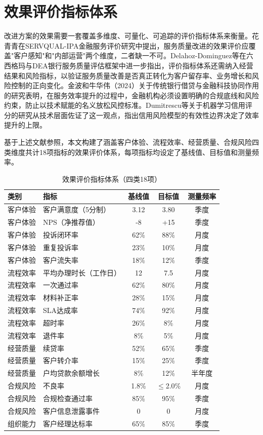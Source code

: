 \section{效果评价指标体系}

改进方案的效果需要一套覆盖多维度、可量化、可追踪的评价指标体系来衡量。花青青在SERVQUAL-IPA金融服务评价研究中提出，服务质量改进的效果评价应覆盖"客户感知"和"内部运营"两个维度，二者缺一不可\cite{ref15}。Delahoz-Dominguez等在六西格玛与DEA银行服务质量评估框架中进一步指出，评价指标体系还需纳入经营结果和风险指标，以验证服务质量改善是否真正转化为客户留存率、业务增长和风险控制的正向变化\cite{ref50}。金波和牛华伟（2024）关于传统银行借贷与金融科技协同作用的研究表明，在服务效率提升的过程中，金融机构必须设置明确的合规底线和风险约束，防止以技术赋能的名义放松风控标准\cite{ref71}。Dumitrescu等关于机器学习信用评分的研究从技术层面佐证了这一观点，指出信用风险模型的有效性边界决定了效率提升的上限\cite{ref24}。

基于上述文献参照，本文构建了涵盖客户体验、流程效率、经营质量、合规风险四类维度共计18项指标的效果评价体系，每项指标均设定了基线值、目标值和测量频率。

\begin{table}[htbp]
  \centering
  \small
  \caption[效果评价指标体系]{效果评价指标体系（四类18项）}
  \label{tab:6-3}
  \begin{tabularx}{\textwidth}{l X c c c}
    \toprule
    \textbf{类别} & \textbf{指标} & \textbf{基线值} & \textbf{目标值} & \textbf{测量频率} \\
    \midrule
    客户体验 & 客户满意度（5分制） & 3.12 & 3.80 & 季度 \\
    客户体验 & NPS（净推荐值） & -8 & +15 & 季度 \\
    客户体验 & 投诉闭环率 & 62\% & 88\% & 月度 \\
    客户体验 & 重复投诉率 & 23\% & 10\% & 月度 \\
    客户体验 & 客户流失率 & 18\% & 12\% & 季度 \\
    流程效率 & 平均办理时长（工作日） & 12 & 7.5 & 月度 \\
    流程效率 & 一次通过率 & 62\% & 80\% & 月度 \\
    流程效率 & 材料补正率 & 28\% & 15\% & 月度 \\
    流程效率 & SLA达成率 & 74\% & 92\% & 月度 \\
    流程效率 & 超时率 & 26\% & 8\% & 月度 \\
    流程效率 & 退件率 & 8\% & 5\% & 月度 \\
    经营质量 & 续贷率 & 52\% & 65\% & 季度 \\
    经营质量 & 客户转介率 & 15\% & 25\% & 季度 \\
    经营质量 & 户均贷款余额增长 & 8\% & 12\% & 半年度 \\
    合规风险 & 不良率 & 1.8\% & $\leq$2.0\% & 月度 \\
    合规风险 & 合规检查通过率 & 85\% & 95\% & 季度 \\
    合规风险 & 客户信息泄露事件 & 0 & 0 & 月度 \\
    组织能力 & 客户经理达标率 & 65\% & 85\% & 季度 \\
    \bottomrule
  \end{tabularx}
\end{table}

